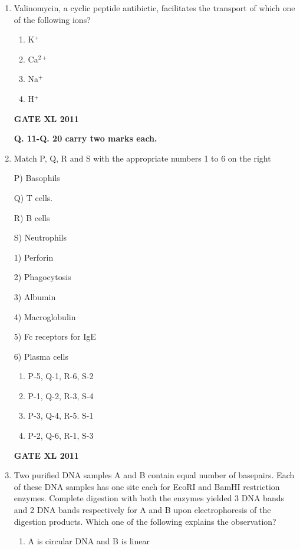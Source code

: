 \documentclass[journal,12pt,onecolumn]{IEEEtran}
\begin{document}
\begin{enumerate}
\item {Valinomycin, a cyclic peptide antibictic, facilitates the transport of which one of the following ions?}
		\begin{enumerate}
			\item K$^+$
			\item Ca$^{2+}$
			\item Na$^+$
			\item H$^+$
		\end{enumerate}
		\hfill{\textbf{GATE XL 2011}}
\begin{center}
\textbf{Q. 11-Q. 20 carry two marks each.}
\end{center}
\item {Match P, Q, R and S with the appropriate numbers 1 to 6 on the right}

	\begin{minipage}{0.5\textwidth}
	\begin{flushleft}

		P) Basophils

Q) T cells.

R) B cells

S) Neutrophils

		\end{flushleft}
		\end{minipage}
	\begin{minipage}{0.5\textwidth}
		\begin{flushleft}
1) Perforin

2) Phagocytosis

3) Albumin

4) Macroglobulin

5) Fc receptors for IgE

6) Plasma cells
		\end{flushleft}
		\end{minipage}
		\begin{enumerate}
			\item P-5, Q-1, R-6, S-2
			\item P-1, Q-2, R-3, S-4
			\item P-3, Q-4, R-5. S-1
			\item P-2, Q-6, R-1, S-3
		\end{enumerate}
		\hfill{\textbf{GATE XL 2011}}

\item {Two purified DNA samples A and B contain equal number of basepairs. Each of these DNA samples has one site each for EcoRI and BamHI restriction enzymes. Complete digestion with both the enzymes yielded 3 DNA bands and 2 DNA bands respectively for A and B upon electrophoresis of the digestion products. Which one of the following explains the observation?}
	\begin{enumerate}
		\item{ A is circular DNA and B is linear}


\end{enumerate}
\end{enumerate}
\end{document}
